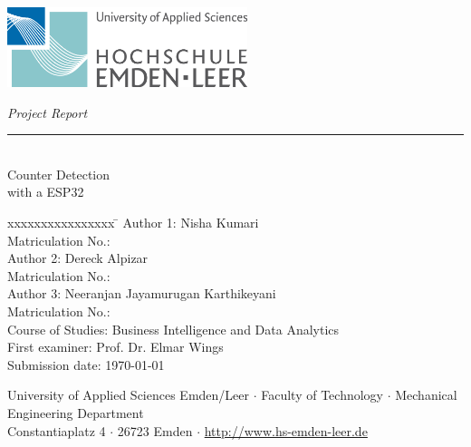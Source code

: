 %
%
%
%

\begin{titlepage}
    
    \begin{flushleft} 
        \includegraphics[width=7cm]{General/HS_EmdenLeer_Logo.png}
    \end{flushleft} 
    
    \begin{flushright}
        \vspace{2cm}
        \LARGE \textsl{Project Report}\\
        \rule{0.6\textwidth}{0.4pt} ~\\
        \vspace{0.5cm}
        \textsf{\LARGE Counter Detection}\\
        \textsf{\LARGE with a ESP32}
    \end{flushright}
    
    \vspace{2cm}
    \large
    \begin{tabbing}
        xxxxxxxxxxxxxxxx \= \kill
        Author 1: \> Nisha Kumari \\
        Matriculation No.:  \\
        Author 2: \> Dereck Alpizar \\
        Matriculation No.:  \\
        Author 3: \> Neeranjan Jayamurugan Karthikeyani \\
        Matriculation No.:  \\
        Course of Studies: \> Business Intelligence and Data Analytics \\ [0.5cm]
        First examiner: \> Prof. Dr. Elmar Wings \\
        Submission date: \> \today \\
    \end{tabbing}
    
    \vspace{2cm}
    \small
    \begin{center}
        University of Applied Sciences Emden/Leer $\cdot$ 
        Faculty of Technology $\cdot$ 
        Mechanical Engineering Department \\
        Constantiaplatz 4 $\cdot$ 
        26723 Emden $\cdot$ 
        \url{http://www.hs-emden-leer.de}
    \end{center}
    
\end{titlepage}
